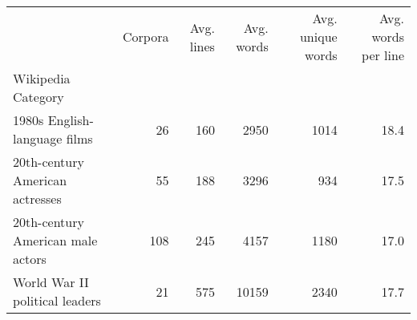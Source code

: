 \begin{tabular}{lrrrrr}
\toprule
 &  Corpora & Avg. lines & Avg. words & Avg. unique words & Avg. words per line \\
Wikipedia Category &  &  &  &  &  \\
\midrule
1980s English-language films & 26 & 160 & 2950 & 1014 & 18.4 \\
20th-century American actresses & 55 & 188 & 3296 & 934 & 17.5 \\
20th-century American male actors & 108 & 245 & 4157 & 1180 & 17.0 \\
World War II political leaders & 21 & 575 & 10159 & 2340 & 17.7 \\
\bottomrule
\end{tabular}
